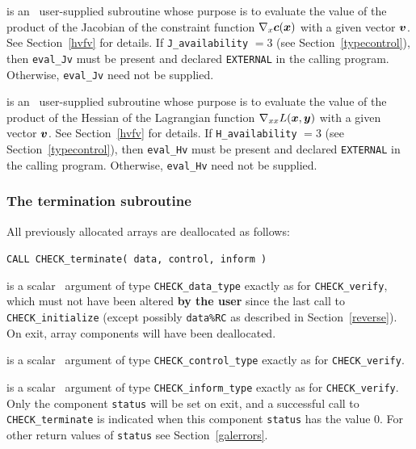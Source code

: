 \documentclass{galahad}
\newcommand{\packagename}{CHECK}
\begin{document}
\begin{description}
 is an \optional\ 
user-supplied subroutine whose purpose is to evaluate the value of the 
product of the Jacobian of the constraint function 
$\nabla_x {\bm{c}}({\bm{x}})$ with a given vector ${\bm{v}}$.
See Section~\ref{hvfv} for details.
If {\tt J\_availability} $=3$ (see Section~\ref{typecontrol}), then {\tt eval\_Jv} must be present and
declared {\tt EXTERNAL} in the calling program.
Otherwise, {\tt eval\_Jv} need not be supplied.

 is an \optional\ 
user-supplied subroutine whose purpose is to evaluate the value of the 
product of the Hessian of the Lagrangian function 
$\nabla_{xx} L({\bm{x}},{\bm{y}})$ with a given vector ${\bm{v}}$.
See Section~\ref{hvfv} for details.
If {\tt H\_availability} $=3$ (see Section~\ref{typecontrol}), then {\tt eval\_Hv} must be present and
declared {\tt EXTERNAL} in the calling program.
Otherwise, {\tt eval\_Hv} need not be supplied.

\end{description}


\subsubsection{The  termination subroutine}
All previously allocated arrays are deallocated as follows:
\vspace*{1mm}

\hspace{8mm}
{\tt CALL \packagename\_terminate( data, control, inform )}

\vspace*{-1mm}
\begin{description}

 is a scalar \intentinout\ argument of type 
{\tt \packagename\_data\_type} 
exactly as for
{\tt \packagename\_verify},
which must not have been altered {\bf by the user} since the last call to 
{\tt \packagename\_initialize} (except possibly {\tt data\%RC} as
described in Section~\ref{reverse}).
On exit, array components will have been deallocated.

 is a scalar \intentin\ argument of type 
{\tt \packagename\_control\_type}
exactly as for
{\tt \packagename\_verify}.

 is a scalar \intentout\ argument of type
{\tt \packagename\_inform\_type}
exactly as for
{\tt \packagename\_verify}.
Only the component {\tt status} will be set on exit, and a 
successful call to 
{\tt \packagename\_terminate}
is indicated when this  component {\tt status} has the value 0. 
For other return values of {\tt status} see Section~\ref{galerrors}.

\end{description}
\end{document}
